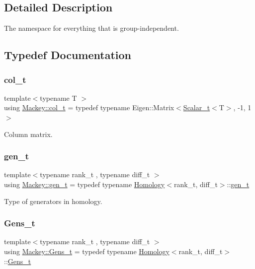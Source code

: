 \subsection{Detailed Description}
The namespace for everything that is group-\/independent. 

\subsection{Typedef Documentation}
\mbox{\label{namespaceMackey_a3374980e3b5001f5ba9b206004180627}} 
\subsubsection{\texorpdfstring{col\+\_\+t}{col\_t}}
{\footnotesize\ttfamily template$<$typename T $>$ \\
using \hyperlink{namespaceMackey_a3374980e3b5001f5ba9b206004180627}{Mackey\+::col\+\_\+t} = typedef typename Eigen\+::\+Matrix$<$\hyperlink{namespaceMackey_a93ba297573961f91101fb84bc84bbe95}{Scalar\+\_\+t}$<$T$>$, -\/1, 1$>$}



Column matrix. 

\mbox{\label{namespaceMackey_a6bb0b2796632ba6c7f8ea192f7aecffe}} 
\subsubsection{\texorpdfstring{gen\+\_\+t}{gen\_t}}
{\footnotesize\ttfamily template$<$typename rank\+\_\+t , typename diff\+\_\+t $>$ \\
using \hyperlink{namespaceMackey_a6bb0b2796632ba6c7f8ea192f7aecffe}{Mackey\+::gen\+\_\+t} = typedef typename \hyperlink{classMackey_1_1Homology}{Homology}$<$rank\+\_\+t, diff\+\_\+t$>$\+::\hyperlink{namespaceMackey_a6bb0b2796632ba6c7f8ea192f7aecffe}{gen\+\_\+t}}



Type of generators in homology. 

\mbox{\label{namespaceMackey_ab2542005948b58de00ac4647ca2c7106}} 
\subsubsection{\texorpdfstring{Gens\+\_\+t}{Gens\_t}}
{\footnotesize\ttfamily template$<$typename rank\+\_\+t , typename diff\+\_\+t $>$ \\
using \hyperlink{namespaceMackey_ab2542005948b58de00ac4647ca2c7106}{Mackey\+::\+Gens\+\_\+t} = typedef typename \hyperlink{classMackey_1_1Homology}{Homology}$<$rank\+\_\+t, diff\+\_\+t$>$\+::\hyperlink{namespaceMackey_ab2542005948b58de00ac4647ca2c7106}{Gens\+\_\+t}}



